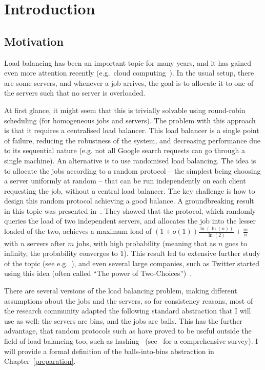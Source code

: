 \chapter{Introduction}\label{introduction}

\ifpdf
    \graphicspath{{Chapter1/Figs/Raster/}{Chapter1/Figs/PDF/}{Chapter1/Figs/}}
\else
    \graphicspath{{Chapter1/Figs/Vector/}{Chapter1/Figs/}}
\fi


\section{Motivation}

Load balancing has been an important topic for many years, and it has gained even more attention recently (e.g.\ cloud computing~\cite{mishra2020cloud}). In the usual setup, there are some servers, and whenever a job arrives, the goal is to allocate it to one of the servers such that no server is overloaded.


At first glance, it might seem that this is trivially solvable using round-robin scheduling (for homogeneous jobs and servers). The problem with this approach is that it requires a centralised load balancer. This load balancer is a single point of failure, reducing the robustness of the system, and decreasing performance due to its sequential nature (e.g. not all Google search requests can go through a single machine). An alternative is to use randomised load balancing. The idea is to allocate the jobs according to a random protocol -- the simplest being choosing a server uniformly at random -- that can be run independently on each client requesting the job, without a central load balancer. The key challenge is how to design this random protocol achieving a good balance. A groundbreaking result in this topic was presented in~\cite{azar1999twochoice}. They showed that the \TwoChoice protocol, which randomly queries the load of two independent servers, and allocates the job into the lesser loaded of the two, achieves a maximum load of $(1+o(1))\frac{\ln(\ln(n))}{\ln(2)} + \frac{m}{n}$ with $n$ servers after $m$ jobs, with high probability (meaning that as $n$ goes to infinity, the probability converges to $1$). This result led to extensive further study of the topic (see e.g.~\cite{richa2001surveytwochoice}), and even several large companies, such as Twitter started using this idea (often called ``The power of Two-Choices'')~\cite{anderson2019twitter}.


There are several versions of the load balancing problem, making different assumptions about the jobs and the servers, so for consistency reasons, most of the research community adapted the following standard abstraction that I will use as well: the servers are bins, and the jobs are balls. This has the further advantage, that random protocols such as \TwoChoice have proved to be useful outside the field of load balancing too, such as hashing~\cite{azar1999twochoice} (see~\cite{wieder2017ballsintobinslandscape} for a comprehensive survey). I will provide a formal definition of the balls-into-bins abstraction in Chapter~\ref{preparation}.

